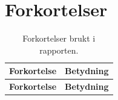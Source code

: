 \section*{Forkortelser}
\small
\setlength{\tabcolsep}{6pt}
\begin{longtable}{>{\raggedright\arraybackslash}p{3.8cm}>{\raggedright\arraybackslash}p{9.9cm}}
\caption{Forkortelser brukt i rapporten.}
\label{tab:forkortelser}\\
\toprule
\rowcolor{tablegreen}
\color{white}\textbf{Forkortelse} &
\color{white}\textbf{Betydning} \\
\midrule
\endfirsthead

\toprule
\rowcolor{tablegreen}
\color{white}\textbf{Forkortelse} &
\color{white}\textbf{Betydning} \\
\midrule
\endhead


\end{longtable}
